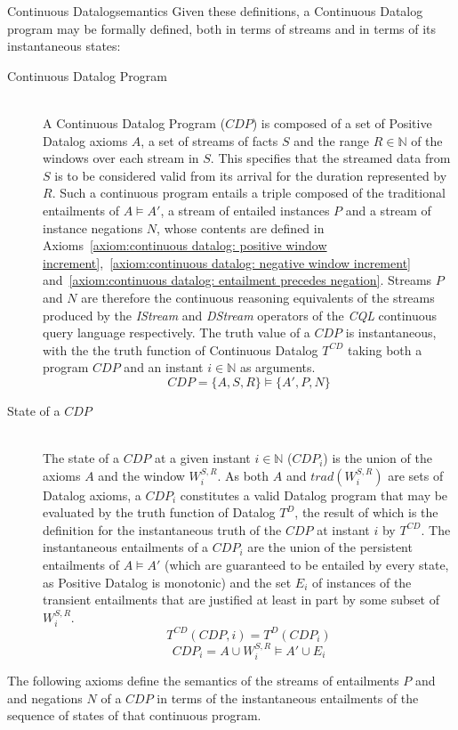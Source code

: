 \begin{nestedsection}{Continuous Datalog}{semantics}
	Given these definitions, a Continuous Datalog program may be formally defined, both in terms of streams and in terms of its instantaneous states:
	\begin{description}
		\item[Continuous Datalog Program\label{def:continuous datalog: CDP}]\hfill\\
			A Continuous Datalog Program (${CDP}$) is composed of a set of Positive Datalog axioms $A$, a set of streams of facts $S$ and the range ${R \in \mathbb{N}}$ of the windows over each stream in $S$.
			This specifies that the streamed data from $S$ is to be considered valid from its arrival for the duration represented by $R$.
			Such a continuous program entails a triple composed of the traditional entailments of ${A \vDash A'}$, a stream of entailed instances $P$ and a stream of instance negations $N$, whose contents are defined in Axioms~\ref{axiom:continuous datalog: positive window increment},~\ref{axiom:continuous datalog: negative window increment} and~\ref{axiom:continuous datalog: entailment precedes negation}.
			Streams $P$ and $N$ are therefore the continuous reasoning equivalents of the streams produced by the \emph{IStream} and \emph{DStream} operators of the \emph{CQL} continuous query language \citep{CQL} respectively.
			The truth value of a ${CDP}$ is instantaneous, with the the truth function of Continuous Datalog $T^{CD}$ taking both a program ${CDP}$ and an instant ${i \in \mathbb{N}}$ as arguments.
			\begin{equation*}
				CDP = \{A,S,R\} \vDash \{A',P,N\}
			\end{equation*}
		\item[State of a ${CDP}$\label{def:continuous datalog: CDPt}]\hfill\\
			The state of a ${CDP}$ at a given instant ${i \in \mathbb{N}}$ (${CDP_{i}}$) is the union of the axioms $A$ and the window $W^{S,R}_{i}$.
			As both $A$ and ${trad\left( W^{S,R}_{i} \right)}$ are sets of Datalog axioms, a ${CDP_{i}}$ constitutes a valid Datalog program that may be evaluated by the truth function of Datalog $T^{D}$, the result of which is the definition for the instantaneous truth of the ${CDP}$ at instant $i$ by $T^{CD}$.
			The instantaneous entailments of a $CDP_{i}$ are the union of the persistent entailments of ${A \vDash A'}$ (which are guaranteed to be entailed by every state, as Positive Datalog is monotonic) and the set $E_{i}$ of instances of the transient entailments that are justified at least in part by some subset of $W^{S,R}_{i}$. 
			\begin{equation*}
				T^{CD} \left( CDP, i \right) = T^{D} \left( CDP_{i} \right)
			\end{equation*}
			\begin{equation*}
				CDP_{i} = A \cup W^{S,R}_{i} \vDash A' \cup E_{i}
			\end{equation*}
	\end{description}
	The following axioms define the semantics of the streams of entailments $P$ and and negations $N$ of a ${CDP}$ in terms of the instantaneous entailments of the sequence of states of that continuous program.


\end{nestedsection}
